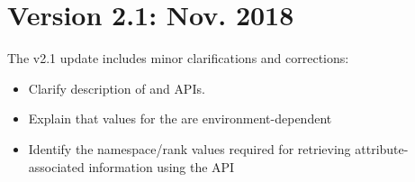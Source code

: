 \section{Version 2.1: Nov. 2018}

The v2.1 update includes minor clarifications and corrections:

\begin{itemize}
    \item Clarify description of  and  \acp{API}.
    \item Explain that values for the  are environment-dependent
    \item Identify the namespace/rank values required for retrieving attribute-associated information using the  \ac{API}
\end{itemize}

